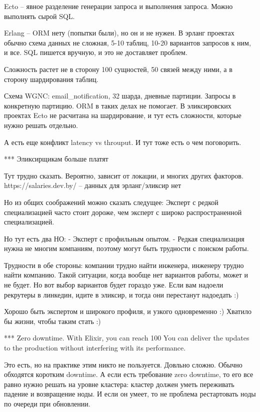 \documentclass[10pt]{beamer}
\begin{document}
Ecto -- явное разделение генерации запроса и выполнения запроса. Можно выполнять сырой SQL.

Erlang -- ORM нету (попытки были), но он и не нужен.
В эрланг проектах обычно схема данных не сложная, 5-10 таблиц, 10-20 вариантов запросов к ним, и все.
SQL пишется вручную, и это не доставляет проблем.

Сложность растет не в сторону 100 сущностей, 50 связей между ними, а в сторону шардирования таблиц.

Схема WGNC: email_notification, 32 шарда, дневные партиции. Запросы в конкретную партицию. ORM в таких делах не помогает.
В эликсировских проектах Ecto не расчитана на шардирование, и тут есть сложности, которые нужно решать отдельно.

А есть еще конфликт latency vs throuput. И тут тоже есть о чем поговорить.



*** Эликсирщикам больше платят

Тут трудно сказать. Вероятно, зависит от локации, и многих других факторов.
https://salaries.dev.by/ -- данных для эрланг/эликсир нет

Но из общих соображений можно сказать следущее:
Эксперт с редкой специализацией часто стоит дороже, чем эксперт с широко распространенной специализацией.

Но тут есть два НО:
- Эксперт с профильным опытом.
- Редкая специализация нужна не многим компаниям, поэтому могут быть трудности с поиском работы.

Трудности в обе стороны: компании трудно найти инженера, инженеру трудно найти компанию.
Такой ситуации, когда вообще нет вариантов работы, может и не будет. Но вот выбор вариантов будет гораздо уже.
Если вам надоели рекрутеры в линкедин, идите в эликсир, и тогда они перестанут надоедать :)

Хорошо быть экспертом и широкого профиля, и узкого одновременно :) Хватило бы жизни, чтобы таким стать :)


*** Zero downtime. With Elixir, you can reach 100%
You can deliver the updates to the production without interfering with its performance.

Это есть, но на практике этим никто не пользуется. Довльно сложно. Обычно обходятся коротким downtime.
А если есть требование zero downtime, то его все равно нужно решать на уровне кластера: кластер должен уметь переживать падение и возвращение ноды.
И если он умеет, то не проблема рестартовать ноды по очереди при обновлении.
\end{document}
